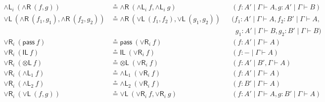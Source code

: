 \documentclass[submission,copyright,creativecommons]{eptcs}
\theoremstyle{definition}
\newcommand{\tl}{\otimes \mathsf{L}}
\newcommand{\pass}{\mathsf{pass}}
\newcommand{\unitl}{\mathsf{IL}}
\newcommand{\andlone}{\land \mathsf{L}_{1}}
\newcommand{\andltwo}{\land \mathsf{L}_{2}}
\newcommand{\andli}{\land \mathsf{L}_{i}}
\newcommand{\andr}{\land \mathsf{R}}
\newcommand{\orl}{\lor \mathsf{L}}
\newcommand{\orrone}{\lor \mathsf{R}_{1}}
\newcommand{\orrtwo}{\lor \mathsf{R}_{2}}
\newcommand{\orri}{\lor \mathsf{R}_{i}}
\begin{document}
\begin{equation}
\begin{array}{rlll}
    \\
    \andli \ (\andr \ (f , g)) &\circeq  \andr \ (\andli \ f , \andli \ g) &&(f : A' \mid \Gamma \vdash A , g : A' \mid \Gamma \vdash B)
    \\
    \orl \ (\andr \ (f_1 , g_1) , \andr \ (f_2 , g_2)) &\circeq  \andr \ (\orl \ (f_1 , f_2) , \orl \ (g_1 , g_2)) &&(f_1 : A' \mid \Gamma \vdash A , f_2 : B' \mid \Gamma \vdash A , 
    \\
    & &&\;\;g_1 : A' \mid \Gamma \vdash B , g_2 : B' \mid \Gamma \vdash B)
    \\
    \orri \ (\pass \ f) &\circeq \pass \ (\orri \ f) &&(f : A' \mid \Gamma \vdash A)
    \\
    \orri \ (\unitl \ f) &\circeq \unitl \ (\orri \ f) &&(f : - \mid \Gamma \vdash A)
    \\
    \orri \ (\tl \ f) &\circeq \tl \ (\orri \ f) &&(f : A' \mid B' , \Gamma \vdash A)
    \\
    \orri \ (\andlone \ f) &\circeq \andlone \ (\orri \ f) &&(f : A' \mid \Gamma \vdash A)
    \\
    \orri \ (\andltwo \ f) &\circeq \andltwo \ (\orri \ f) &&(f : B' \mid \Gamma \vdash A)
    \\
    \orri \ (\orl \ (f , g)) &\circeq \orl \ (\orri \ f , \orri \ g) &&(f : A' \mid \Gamma \vdash A , g : B' \mid \Gamma \vdash A)
  \end{array}
  \end{equation}
\end{document}
